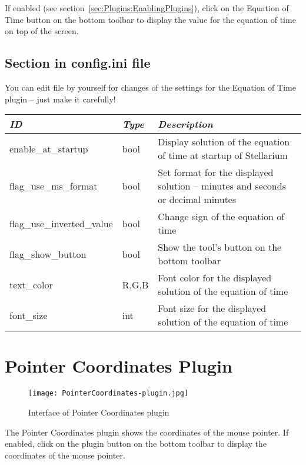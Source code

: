 If enabled (see section~\ref{sec:Plugins:EnablingPlugins}), click on
the Equation of Time button 
on the bottom toolbar to display the value for the equation of time on
top of the screen.


\subsection{Section  in config.ini file}

You can edit  file by yourself for changes of the
settings for the Equation of Time plugin -- just make it carefully!

\noindent%
\begin{tabularx}{\textwidth}{l|l|X}\toprule
\emph{ID}            & \emph{Type} & \emph{Description}\\\midrule
enable\_at\_startup        & bool  & Display solution of the equation of time at startup of Stellarium\\%
flag\_use\_ms\_format      & bool  & Set format for the displayed solution -- minutes and seconds or decimal minutes\\%
flag\_use\_inverted\_value & bool  & Change sign of the equation of time \\%
flag\_show\_button         & bool  & Show the tool's button on the bottom toolbar\\%
text\_color                & R,G,B & Font color for the displayed solution of the equation of time\\%
font\_size                 & int   & Font size for the displayed solution of the equation of time \\\bottomrule
\end{tabularx}

\newpage

\section{Pointer Coordinates Plugin}
\label{sec:plugins:PointerCoordinates}


\begin{figure}[th]\centering
\texttt{[image: PointerCoordinates-plugin.jpg]}
\caption{Interface of Pointer Coordinates plugin}
\label{fig:PointerCoordinates}
\end{figure}

\noindent The Pointer Coordinates plugin shows the coordinates of the mouse pointer.
If enabled, click on the plugin button  on the bottom toolbar to display the coordinates of the mouse pointer.

